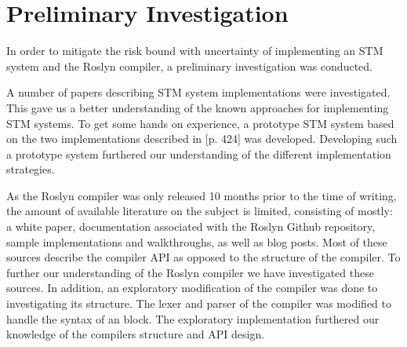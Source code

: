 \makeatletter {}\makeatother
{}
\label{chap:reflection}
\section{Preliminary Investigation}
In order to mitigate the risk bound with uncertainty of implementing an \ac{STM} system and the Roslyn compiler, a preliminary investigation was conducted. 

A number of papers describing \ac{STM} system implementations were investigated. This gave us a better understanding of the known approaches for implementing \ac{STM} systems. To get some hands on experience, a prototype \ac{STM} system based on the two implementations described in \cite{herlihy2012art}[p. 424] was developed. Developing such a prototype system furthered our understanding of the different implementation strategies.

As the Roslyn compiler was only released 10 months prior to the time of writing, the amount of available literature on the subject is limited, consisting of mostly: a white paper\cite{ng2012roslyn}, documentation associated with the Roslyn Github repository\cite{roslynwiki}, sample implementations and walkthroughs\cite{roslynsamples}, as well as blog posts. Most of these sources describe the compiler \ac{API} as opposed to the structure of the compiler. To further our understanding of the Roslyn compiler we have investigated these sources. In addition, an exploratory modification of the compiler was done to investigating its structure. The lexer and parser of the compiler was modified to handle the syntax of an  block. The exploratory implementation furthered our knowledge of the compilers structure and \ac{API} design.
\worksheetend
